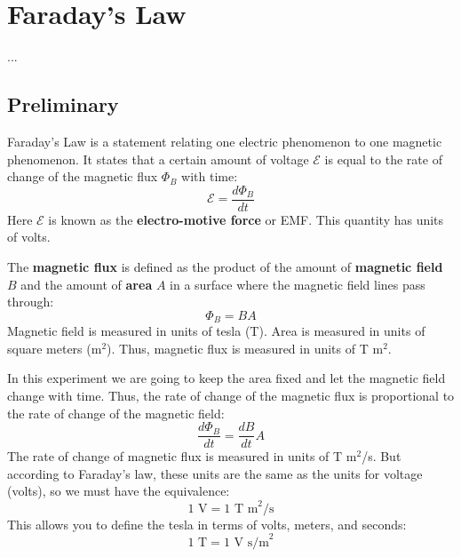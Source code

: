 \setcounter{chapter}{3}
\chapter{Faraday's Law}
...
\section{Preliminary}
Faraday's Law is a statement relating one electric phenomenon to one magnetic phenomenon. It states that a certain amount of voltage $\mathcal{E}$ is equal to the rate of change of the magnetic flux $\Phi_{B}$ with time:
\begin{equation}
	\mathcal{E} = \frac{d \Phi_{B}}{d t}
	\label{eq.04.faradays.law}
\end{equation}
Here $\mathcal{E}$ is known as the \textbf{electro-motive force} or EMF. This quantity has units of volts.

The \textbf{magnetic flux} is defined as the product of the amount of \textbf{magnetic field} $B$ and the amount of \textbf{area} $A$ in a surface where the magnetic field lines pass through:
\begin{equation}
	\Phi_{B} = B A
\end{equation}
Magnetic field is measured in units of tesla (T). Area is measured in units of square meters (m$^{2}$). Thus, magnetic flux is measured in units of T m$^{2}$.

In this experiment we are going to keep the area fixed and let the magnetic field change with time. Thus, the rate of change of the magnetic flux is proportional to the rate of change of the magnetic field:
\begin{equation}
	\frac{d \Phi_{B}}{d t} = \frac{d B}{d t} A
	\label{eq.04.flux.rate}
\end{equation}
The rate of change of magnetic flux is measured in units of T m$^{2}$/s. But according to Faraday's law, these units are the same as the units for voltage (volts), so we must have the equivalence:
\begin{equation}
	1 \text{ V} = 1 \text{ T m}^{2}\text{/s}
\end{equation}
This allows you to define the tesla in terms of volts, meters, and seconds:
\begin{equation}
	1 \text{ T} = 1 \text{ V s/m}^2
\end{equation}


